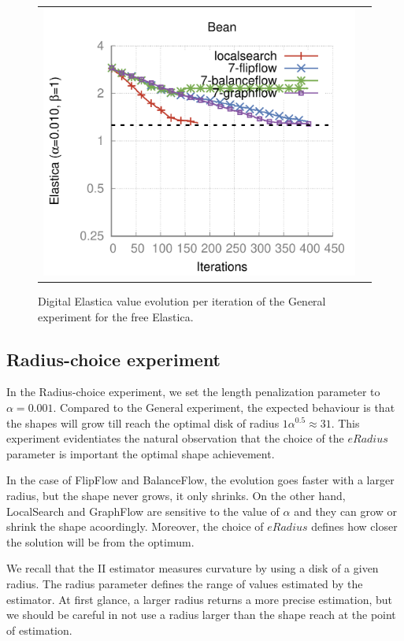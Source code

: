 \begin{figure}
\begin{tabular}{cc}
\includegraphics[scale=0.45]{figures/chapter9/free-elastica/plots/iteration/main_experiment/len_pen_0.01/radius-7/bean.pdf}
\end{tabular}
\caption{Digital Elastica value evolution per iteration of the General experiment for the free Elastica.}
\label{fig:plots-free-elastica-general}
\end{figure}

\subsection{Radius-choice experiment}

In the Radius-choice experiment, we set the length penalization parameter to $\alpha=0.001$. Compared to the General experiment, the expected behaviour is that the shapes will grow till reach the optimal disk of radius $1\alpha^{0.5} \approx 31$. This experiment evidentiates the natural observation that the choice of the $eRadius$ parameter is important the optimal shape achievement.

In the case of FlipFlow and BalanceFlow, the evolution goes faster with a larger radius, but the shape never grows, it only shrinks. On the other hand, LocalSearch and GraphFlow are sensitive to the value of $\alpha$ and they can grow or shrink the shape acoordingly. Moreover, the choice of $eRadius$ defines how closer the solution will be from the optimum.

We recall that the II estimator measures curvature by using a disk of a given radius. The radius parameter defines the range of values estimated by the estimator. At first glance, a larger radius returns a more precise estimation, but we should be careful in not use a radius larger than the shape reach at the point of estimation.

